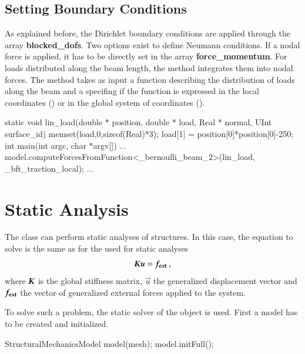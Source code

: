 \subsection{Setting Boundary Conditions}\label{sect:structMechMod:boundary}
As explained before, the Dirichlet boundary conditions are applied
through the array \textbf{blocked\_dofs}. Two options exist to define
Neumann conditions.  If a nodal force is applied, it has to be
directly set in the array \textbf{force\_momentum}. For loads
distributed along the beam length, the method
 integrates them into nodal forces.
The method takes as input a function describing the distribution of
loads along the beam and a  specifing if
the function is expressed in the local coordinates
() or in the global system of coordinates
().
\begin{cpp}
 static void lin_load(double * position, double * load,
		      Real * normal, UInt surface_id){
  memset(load,0,sizeof(Real)*3);
  load[1] = position[0]*position[0]-250;
}
int main(int argc, char *argv[]){
...
model.computeForcesFromFunction<_bernoulli_beam_2>(lin_load,
                                                   _bft_traction_local);
...}
\end{cpp}


\section{Static Analysis\label{sect:structMechMod:static}}

The  class can perform static analyses
of structures.  In this case, the equation to solve is the same as for
the  used for static analyses
\begin{equation}\label{eqn:structMechMod:static}
  \boldsymbol{K} \boldsymbol{u} = \boldsymbol{f_{{\mathrm{ext}}}}~,
\end{equation}
where $\boldsymbol{K}$ is the global stiffness matrix, $\vec{u}$ the
generalized displacement vector and $\boldsymbol{f_{{\mathrm{ext}}}}$ the vector of
generalized external forces applied to the system.

To solve such a problem, the static solver of the
 object
is used.  First a model has to be created and initialized.

\begin{cpp}
  StructuralMechanicsModel model(mesh);
  model.initFull();
\end{cpp}


